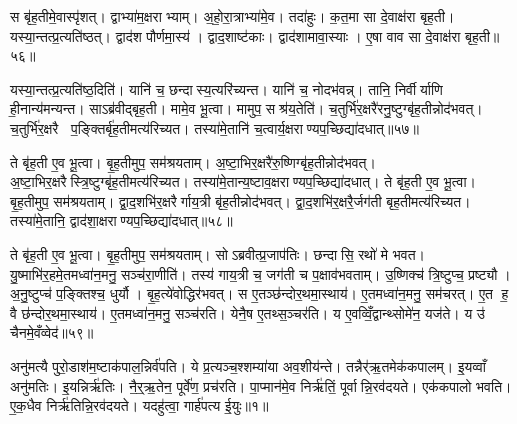 स बृ॑ह॒तीमे॒वास्पृ॑शत्। द्वाभ्या॑म॒क्षराभ्याम्। अ॒हो॒रा॒त्राभ्या॑मे॒व। तदा॑हुः। क॒त॒मा सा दे॒वाक्ष॑रा बृह॒ती। यस्या॒न्तत्प्र॒त्यति॑ष्ठत्। द्वाद॑श पौर्णमा॒स्य॑। द्वाद॒शाष्ट॑काः। द्वाद॑शामावा॒स्याः। ए॒षा वाव सा दे॒वाक्ष॑रा बृह॒ती॥५६॥

यस्या॒न्तत्प्र॒त्यति॑ष्ठ॒दिति॑। यानि॑ च॒ छन्दास्य॒त्यरि॑च्यन्त। यानि॑ च॒ नोदभ॑वन्न्। तानि॒ निर्वीर्याणि ही॒नान्य॑मन्यन्त। साऽब्र॑वीद्बृह॒ती। मामे॒व भू॒त्वा। मामुप॒ सश्र॑य॒तेति॑। च॒तुर्भि॑र॒क्षरै॑रनु॒ष्टुग्बृ॑ह॒तीन्नोद॑भवत्। च॒तुर्भि॑र॒क्षरै प॒ङ्क्तिर्बृ॑ह॒तीमत्य॑रिच्यत। तस्या॑मे॒तानि॑ च॒त्वार्य॒क्षराण्यप॒च्छिद्या॑दधात्॥५७॥

ते बृ॑ह॒ती ए॒व भू॒त्वा। बृ॒ह॒तीमुप॒ सम॑श्रयताम्। अ॒ष्टा॒भिर॒क्षरै॑रु॒ष्णिग्बृ॑ह॒तीन्नोद॑भवत्। अ॒ष्टा॒भिर॒क्षरैस्त्रि॒ष्टुग्बृ॑ह॒तीमत्य॑रिच्यत। तस्या॑मे॒तान्य॒ष्टाव॒क्षराण्यप॒च्छिद्या॑दधात्। ते बृ॑ह॒ती ए॒व भू॒त्वा। बृ॒ह॒तीमुप॒ सम॑श्रयताम्। द्वा॒द॒शभि॑र॒क्षरैर्गाय॒त्री बृ॑ह॒तीन्नोद॑भवत्। द्वा॒द॒शभि॑र॒क्षरै॒र्जग॑ती बृह॒तीमत्य॑रिच्यत। तस्या॑मे॒तानि॒ द्वाद॑शा॒क्षराण्यप॒च्छिद्या॑दधात्॥५८॥

ते बृ॑ह॒ती ए॒व भू॒त्वा। बृ॒ह॒तीमुप॒ सम॑श्रयताम्। सोऽब्रवीत्प्र॒जाप॑तिः। छन्दासि॒ रथो॑ मे भवत। यु॒ष्माभि॑र॒हमे॒तमध्वा॑न॒मनु॒ सञ्च॑रा॒णीति॑। तस्य॑ गाय॒त्री च॒ जग॑ती च प॒क्षाव॑भवताम्। उ॒ष्णिक्च॑ त्रि॒ष्टुप्च॒ प्रष्ट्यौ। अ॒नु॒ष्टुप्च॑ प॒ङ्क्तिश्च॒ धुर्यौ। बृ॒ह॒त्ये॑वोद्धिर॑भवत्। स ए॒तञ्छ॑न्दोर॒थमा॒स्थाय॑। ए॒तमध्वा॑न॒मनु॒ सम॑चरत्। ए॒त ह॒ वै छ॑न्दोर॒थमा॒स्थाय॑। ए॒तमध्वा॑न॒मनु॒ सञ्च॑रति। येनै॒ष ए॒तथ्स॒ञ्चर॑ति। य ए॒वव्विँ॒द्वान्थ्सोमे॑न॒ यज॑ते। य उ॑ चैनमे॒वँव्वेद॑॥५९॥\anuvakamend[अ॒भ॒व॒न्वाव सा दे॒वाक्ष॑रा बृह॒त्य॑दधा॒द्द्वाद॑शा॒क्षराण्यप॒च्छिद्या॑दधादा॒स्थाय॒ षट्च॑]





\clearpage
{}
\setcounter{anuvakam}{0}
अनु॑मत्यै पुरो॒डाश॑म॒ष्टाक॑पाल॒न्निर्व॑पति। ये प्र॒त्यञ्च॒श्शम्या॑या अव॒शीय॑न्ते। तन्नैर्॑ऋ॒तमेक॑कपालम्। इ॒यव्वाँ अनु॑मतिः। इ॒यन्निर्\mbox{}ऋ॑तिः। नै॒र्॒ऋ॒तेन॒ पूर्वे॑ण॒ प्रच॑रति। पा॒प्मान॑मे॒व निर्\mbox{}ऋ॑तिं॒ पूर्वान्नि॒रव॑दयते। एक॑कपालो भवति। ए॒क॒धैव निर्\mbox{}ऋ॑तिन्नि॒रव॑दयते। यदहु॑त्वा॒ गार्\mbox{}ह॑पत्य ई॒युः॥१॥


